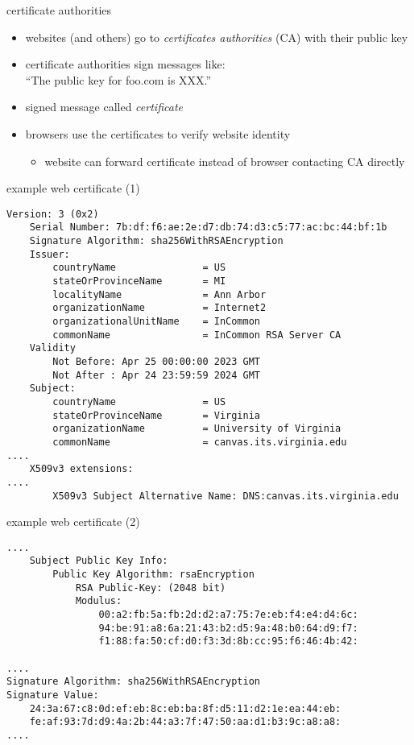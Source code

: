 \begin{frame}{certificate authorities}
    \begin{itemize}
    \item websites (and others) go to \textit{certificates authorities} (CA) with their public key
    \item certificate authorities sign messages like: \\
        ``The public key for foo.com is XXX.''
    \item signed message called \textit{certificate}
    \item browsers use the certificates to verify website identity
        \begin{itemize}
        \item website can forward certificate instead of browser contacting CA directly
        \end{itemize}
    \end{itemize}
\end{frame}

\begin{frame}[fragile]{example web certificate (1)}
\begin{Verbatim}[fontsize=\scriptsize]
    Version: 3 (0x2)
    Serial Number: 7b:df:f6:ae:2e:d7:db:74:d3:c5:77:ac:bc:44:bf:1b
    Signature Algorithm: sha256WithRSAEncryption
    Issuer:
        countryName               = US
        stateOrProvinceName       = MI
        localityName              = Ann Arbor
        organizationName          = Internet2
        organizationalUnitName    = InCommon
        commonName                = InCommon RSA Server CA
    Validity
        Not Before: Apr 25 00:00:00 2023 GMT
        Not After : Apr 24 23:59:59 2024 GMT
    Subject:
        countryName               = US
        stateOrProvinceName       = Virginia
        organizationName          = University of Virginia
        commonName                = canvas.its.virginia.edu
....
    X509v3 extensions:
....
        X509v3 Subject Alternative Name: DNS:canvas.its.virginia.edu
\end{Verbatim}
\end{frame}

\begin{frame}[fragile]{example web certificate (2)}
\begin{Verbatim}[fontsize=\scriptsize]
....
    Subject Public Key Info:
        Public Key Algorithm: rsaEncryption
            RSA Public-Key: (2048 bit)
            Modulus:
                00:a2:fb:5a:fb:2d:d2:a7:75:7e:eb:f4:e4:d4:6c:
                94:be:91:a8:6a:21:43:b2:d5:9a:48:b0:64:d9:f7:
                f1:88:fa:50:cf:d0:f3:3d:8b:cc:95:f6:46:4b:42:

....
Signature Algorithm: sha256WithRSAEncryption
Signature Value:
    24:3a:67:c8:0d:ef:eb:8c:eb:ba:8f:d5:11:d2:1e:ea:44:eb:
    fe:af:93:7d:d9:4a:2b:44:a3:7f:47:50:aa:d1:b3:9c:a8:a8:
....
\end{Verbatim}
\end{frame}


